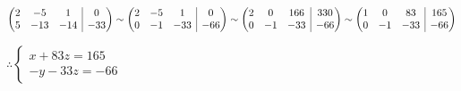 \documentclass{article}
\def\lthtmlcheckvsize{\ifdim\ht\sizebox<\vsize 
  \ifdim\wd\sizebox<\hsize\expandafter\hfill\fi \expandafter\vfill
  \else\expandafter\vss\fi}%
\begin{document}
{\newpage\clearpage
{}%
\begin{displaymath}\left(
\begin{array}{@{}c|c@{}}
    \begin{matrix}
    2 & -5 & 1\\
    5 & -13 & -14\\
\end{matrix} & \begin{matrix}
    0\\-33
\end{matrix}\end{array}\right)
\sim\left(
\begin{array}{@{}c|c@{}}
    \begin{matrix}
    2 & -5 & 1\\
    0 & -1 & -33\\
    \end{matrix} & \begin{matrix}
    0\\-66
\end{matrix} \end{array}\right)
\sim\left(
\begin{array}{@{}c|c@{}}
\begin{matrix}
    2 & 0 & 166\\
    0 & -1 & -33\\
\end{matrix} & \begin{matrix}
330\\-66
\end{matrix}\end{array}\right)
\sim\left(\begin{array}{@{}c|c@{}}\begin{matrix}
    1 & 0 & 83\\
    0 & -1 & -33\\
\end{matrix} & \begin{matrix}
165\\-66
\end{matrix} \end{array} \right)\end{displaymath}%
\lthtmldisplayZ
\lthtmlcheckvsize\clearpage}

{\newpage\clearpage
{}%

$ \therefore \begin{cases}
x+83z=165\\-y-33z=-66
\end{cases}$%
\lthtmlindisplaymathZ
\lthtmlcheckvsize\clearpage}
\end{document}
